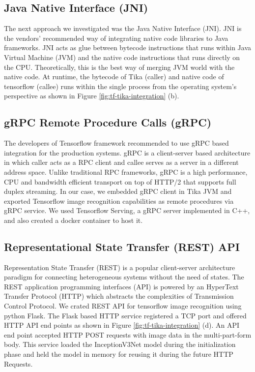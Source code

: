 \subsection{Java Native Interface (JNI)} \label{sec:int-jni}
The next approach we investigated was the Java Native Interface (JNI). JNI is the vendors' recommended way of integrating native code libraries to Java frameworks\cite{}. JNI acts as glue between bytecode instructions that runs within Java Virtual Machine (JVM) and the native  code instructions that runs directly on the CPU. Theoretically, this is the best way of merging JVM world with the native code\cite{}. At runtime, the bytecode of Tika (caller) and native code of tensorflow (callee) runs within the single process from the operating system's perspective as shown in Figure \ref{fig:tf-tika-integration} (b).


\subsection{gRPC Remote Procedure Calls (gRPC)} \label{sec:int-rpc}
The developers of Tensorflow framework recommended to use gRPC based integration for the production systems\cite{goog-tfserve}. gRPC is a client-server based architecture in which caller acts as a RPC client and callee serves as a server in a different address space. Unlike traditional RPC frameworks, gRPC is a high performance, CPU and bandwidth efficient transport on top of HTTP/2 that supports full duplex streaming\cite{about-grpc}. In our case, we embedded gRPC client in Tika JVM and exported Tensorflow image recognition capabilities as remote procedures via gRPC service. We used Tensorflow Serving, a gRPC server implemented in C++, and also created a docker container to host it.


\subsection{Representational State Transfer (REST) API} \label{sec:int-rest}
Representation State Transfer (REST) is a popular client-server architecture paradigm for connecting heterogeneous systems without the need of states\cite[Chapter~5]{Fielding:2000:ASD:932295}. The REST application programming interfaces (API) is powered by an HyperText Transfer Protocol (HTTP) which abstracts the complexities of Transmission Control Protocol.
We crated REST API for tensorflow image recognition using python Flask\cite{}. The Flask based HTTP service registered a TCP port and offered HTTP API end points as shown in Figure \ref{fig:tf-tika-integration} (d).
An API end point accepted HTTP POST requests with image data in the multi-part-form body. This service loaded the InceptionV3Net \cite{SzegedyVISW15} model during the initialization phase and held the model in memory for reusing it during the future HTTP Requests.

